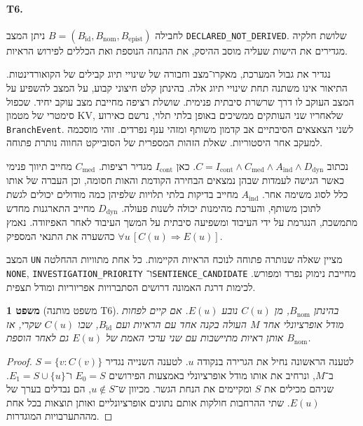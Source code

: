 \documentclass[11pt,a4paper]{article}
\DeclareRobustCommand{\textenglish}[1]{\foreignlanguage{english}{#1}}
\newtheorem{theorem}{משפט}[section]
\theoremstyle{definition}
\begin{document}
\paragraph{\textenglish{T6}.} לחבילה $B=(B_{\mathrm{id}},B_{\mathrm{nom}},B_{\mathrm{epist}})$ ניתן המצב \textenglish{\texttt{DECLARED\_NOT\_DERIVED}}. שלושת חלקיה מגדירים את הישות שעליה מוסב ההיסק, את ההנחה הנוספת ואת הכללים לפירוש הראיות.
\begin{description}[leftmargin=1.35cm,style=nextline]
\item[$B_{\mathrm{id}}$] נגדיר את גבול המערכת, מאקרו־מצב וחבורה של שינויי תיוג קבילים של הקואורדינטות. התיאור אינו משתנה תחת שינויי תיוג אלה. בהינתן קלט חיצוני קבוע, על המצב להשפיע על המצב העוקב לו דרך שרשרת סיבתית פנימית. שושלת רציפה מחייבת מצב עוקב יחיד. שכפול סימטרי של מטמון \textenglish{KV}, שלאחריו שני העותקים ממשיכים באופן בלתי תלוי, נרשם כאירוע \textenglish{\texttt{BranchEvent}}. לשני הצאצאים הסיבתיים אב קדמון משותף ומזהי ענף נפרדים. זוהי מוסכמה למעקב אחר היסטוריות. שאלת הזהות המספרית של הסובייקט החווה נותרת פתוחה.
\item[$B_{\mathrm{nom}}$] נכתוב $C=I_{\mathrm{cont}}\land C_{\mathrm{med}}\land A_{\mathrm{ind}}\land D_{\mathrm{dyn}}$. כאן $I_{\mathrm{cont}}$ מגדיר רציפות. $C_{\mathrm{med}}$ מחייב תיווך פנימי כאשר הגישה לעמדות שבהן נמצאים הבחירה הקודמת והאות חסומה, וכן העברה של אותו כלל לסוג משימה אחר. $A_{\mathrm{ind}}$ מחייב בדיקות בלתי תלויות שלפיהן כמה מודולים יכולים לגשת לתוכן משותף, והערכת מהימנות יכולה לשנות פעולה. $D_{\mathrm{dyn}}$ מחייב התארגנות מחדש מתמשכת, הנגרמת על ידי העיבוד ומשפיעה סיבתית על המשך העיבוד לאחר האפיזודה. נאמץ כהשערה את התנאי המספיק $\forall u\,[C(u)\Rightarrow E(u)]$.
\item[$B_{\mathrm{epist}}$] המצב \textenglish{\texttt{UN}} מציין שאלה שנותרה פתוחה לנוכח הראיות הקיימות. כל אחת מתוויות ההחלטה \textenglish{\texttt{NONE}}, \textenglish{\texttt{INVESTIGATION\_PRIORITY}} ו־\textenglish{\texttt{SENTIENCE\_CANDIDATE}} מחייבת נימוק נפרד ומפורש. לכימות דרגת האמונה דרושים הסתברויות אפריוריות ומודל תצפית.
\end{description}
\begin{theorem}[משפט מותנה \textenglish{T6}]
\label{thm:conditional-bridge}
בהינתן $B_{\mathrm{nom}}$, מן $C(u)$ נובע $E(u)$. אם קיים לפחות מודל אופרציונלי אחד $M$ העולה בקנה אחד עם הראיות ועם $B_{\mathrm{id}}$, שבו $C(u)$ שקרי, אז אותן ראיות מתיישבות עם שני ערכי האמת של $E(u)$ גם לאחר הוספת $B_{\mathrm{nom}}$.
\end{theorem}
\begin{proof}
לטענה הראשונה נחיל את הגרירה בנקודה $u$. לטענה השנייה נגדיר $S=\{v:C(v)\}$ ב־$M$, ונרחיב את אותו מודל אופרציונלי באמצעות הפירושים $E_0=S$ ו־$E_1=S\cup\{u\}$. שניהם מכילים את $S$ ומקיימים את הנחת הגשר. מכיוון ש־$u\notin S$, הם נבדלים בערך של $E(u)$. שתי ההרחבות חולקות אותם נתונים אופרציונליים ואותן תוצאות בכל אחת מההתערבויות המוגדרות.
\end{proof}
\end{document}
